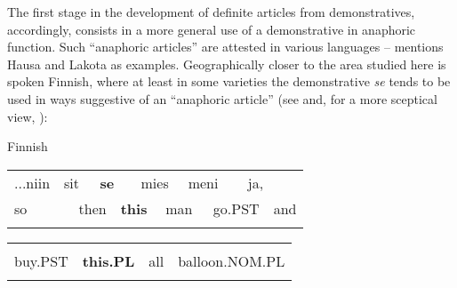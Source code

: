 \begin{styleBodyTextFirst}
The first stage in the development of definite articles from demonstratives, accordingly, consists in a more general use of a demonstrative in anaphoric function. Such “anaphoric articles” are attested in various languages – \citet[53-54]{Lyons1999} mentions Hausa and Lakota as examples. Geographically closer to the area studied here is spoken Finnish, where at least in some varieties the demonstrative \textit{se }tends to be used in ways suggestive of an “anaphoric article” (see \citet{Laury1997} and, for a more sceptical view, \citet{Juvonen2000}):

\end{styleBodyTextFirst}

\begin{listWWNumileveli}
\item 

\begin{styleExample}
Finnish

\end{styleExample}

\end{listWWNumileveli}

\begin{tabular}{llllllllllll}
\lsptoprule
...niin & \multicolumn{2}{l}{sit

} & \multicolumn{2}{l}{{\bfseries se}

} & \multicolumn{2}{l}{mies

} & \multicolumn{2}{l}{meni

} & \multicolumn{2}{l}{ja,

} & \\
\multicolumn{2}{l}{so

} & \multicolumn{2}{l}{then

} & \multicolumn{2}{l}{{\bfseries this}

} & \multicolumn{2}{l}{man

} & \multicolumn{2}{l}{go.PST

} & \multicolumn{2}{l}{and

}\\
\lspbottomrule
\end{tabular}

\begin{tabular}{llll}
\lsptoprule
\multicolumn{4}{l}{osti

}\\
buy.PST & {\bfseries this.PL} & all & balloon.NOM.PL\\
\lspbottomrule
\end{tabular}

